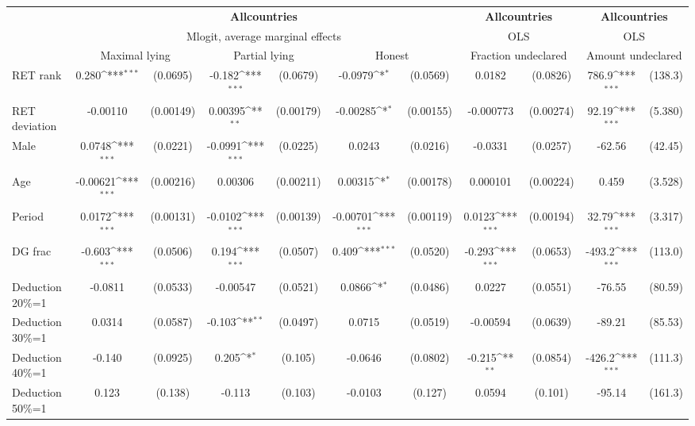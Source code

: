 \def\sym#1{\ifmmode^{#1}\else\(^{#1}\)\fi}
\begin{tabular}{l|cccccc|cc|cc}
\hline\hline
&\multicolumn{6}{c|}{\bf All\space{}countries}&\multicolumn{2}{c|}{\bf All\space{}countries}&\multicolumn{2}{c}{\bf All\space{}countries}\\ &\multicolumn{6}{c|}{Mlogit, average marginal effects }&\multicolumn{2}{c|}{OLS}&\multicolumn{2}{c}{OLS}\\
                &\multicolumn{2}{c}{Maximal lying}&\multicolumn{2}{c}{Partial lying}&\multicolumn{2}{c}{Honest}  &\multicolumn{2}{c}{Fraction undeclared}&\multicolumn{2}{c}{Amount undeclared}\\
\hline
RET rank        &    0.280\sym{***}& (0.0695)&   -0.182\sym{***}& (0.0679)&  -0.0979\sym{*}  & (0.0569)&   0.0182         & (0.0826)&    786.9\sym{***}&  (138.3)\\
RET deviation   & -0.00110         &(0.00149)&  0.00395\sym{**} &(0.00179)& -0.00285\sym{*}  &(0.00155)&-0.000773         &(0.00274)&    92.19\sym{***}&  (5.380)\\
Male            &   0.0748\sym{***}& (0.0221)&  -0.0991\sym{***}& (0.0225)&   0.0243         & (0.0216)&  -0.0331         & (0.0257)&   -62.56         &  (42.45)\\
Age             & -0.00621\sym{***}&(0.00216)&  0.00306         &(0.00211)&  0.00315\sym{*}  &(0.00178)& 0.000101         &(0.00224)&    0.459         &  (3.528)\\
Period          &   0.0172\sym{***}&(0.00131)&  -0.0102\sym{***}&(0.00139)& -0.00701\sym{***}&(0.00119)&   0.0123\sym{***}&(0.00194)&    32.79\sym{***}&  (3.317)\\
DG frac         &   -0.603\sym{***}& (0.0506)&    0.194\sym{***}& (0.0507)&    0.409\sym{***}& (0.0520)&   -0.293\sym{***}& (0.0653)&   -493.2\sym{***}&  (113.0)\\
Deduction 20\%=1&  -0.0811         & (0.0533)& -0.00547         & (0.0521)&   0.0866\sym{*}  & (0.0486)&   0.0227         & (0.0551)&   -76.55         &  (80.59)\\
Deduction 30\%=1&   0.0314         & (0.0587)&   -0.103\sym{**} & (0.0497)&   0.0715         & (0.0519)& -0.00594         & (0.0639)&   -89.21         &  (85.53)\\
Deduction 40\%=1&   -0.140         & (0.0925)&    0.205\sym{*}  &  (0.105)&  -0.0646         & (0.0802)&   -0.215\sym{**} & (0.0854)&   -426.2\sym{***}&  (111.3)\\
Deduction 50\%=1&    0.123         &  (0.138)&   -0.113         &  (0.103)&  -0.0103         &  (0.127)&   0.0594         &  (0.101)&   -95.14         &  (161.3)\\

\end{tabular}
